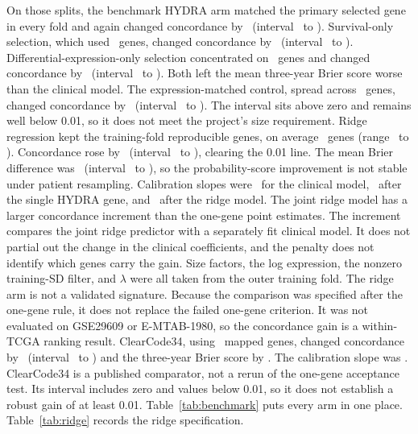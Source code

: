 On those splits, the benchmark HYDRA arm matched the primary selected gene in every fold and again changed concordance by \BenchHydraDelta\ (interval \BenchHydraCiLow\ to \BenchHydraCiHigh). Survival-only selection, which used \BenchSurvivalGenes\ genes, changed concordance by \BenchSurvivalDelta\ (interval \BenchSurvivalCiLow\ to \BenchSurvivalCiHigh). Differential-expression-only selection concentrated on \BenchDeGenes\ genes and changed concordance by \BenchDeDelta\ (interval \BenchDeCiLow\ to \BenchDeCiHigh). Both left the mean three-year Brier score worse than the clinical model. The expression-matched control, spread across \BenchControlGenes\ genes, changed concordance by \BenchControlDelta\ (interval \BenchControlCiLow\ to \BenchControlCiHigh). The interval sits above zero and remains well below 0.01, so it does not meet the project's size requirement. Ridge regression kept the training-fold reproducible genes, on average \BenchRidgeGenes\ genes (range \BenchRidgeGenesMin\ to \BenchRidgeGenesMax). Concordance rose by \BenchRidgeDelta\ (interval \BenchRidgeCiLow\ to \BenchRidgeCiHigh), clearing the 0.01 line. The mean Brier difference was \BenchRidgeBrier\ (interval \BenchRidgeBrierCiLow\ to \BenchRidgeBrierCiHigh), so the probability-score improvement is not stable under patient resampling. Calibration slopes were \BenchClinicalSlope\ for the clinical model, \BenchHydraSlope\ after the single HYDRA gene, and \BenchRidgeSlope\ after the ridge model. The joint ridge model has a larger concordance increment than the one-gene point estimates. The increment compares the joint ridge predictor with a separately fit clinical model. It does not partial out the change in the clinical coefficients, and the penalty does not identify which genes carry the gain. Size factors, the log expression, the nonzero training-SD filter, and $\lambda$ were all taken from the outer training fold. The ridge arm is not a validated signature. Because the comparison was specified after the one-gene rule, it does not replace the failed one-gene criterion. It was not evaluated on GSE29609 or E-MTAB-1980, so the concordance gain is a within-TCGA ranking result. ClearCode34, using \ClearcodeGenes\ mapped genes, changed concordance by \ClearcodeDelta\ (interval \ClearcodeCiLow\ to \ClearcodeCiHigh) and the three-year Brier score by \ClearcodeBrier. The calibration slope was \ClearcodeSlope. ClearCode34 is a published comparator, not a rerun of the one-gene acceptance test. Its interval includes zero and values below 0.01, so it does not establish a robust gain of at least 0.01. Table~\ref{tab:benchmark} puts every arm in one place. Table~\ref{tab:ridge} records the ridge specification.

